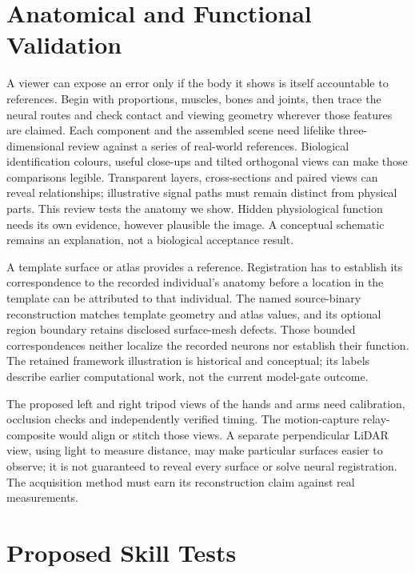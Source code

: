 \section{Anatomical and Functional Validation}

A viewer can expose an error only if the body it shows is itself accountable to references. Begin with proportions, muscles, bones and joints, then trace the neural routes and check contact and viewing geometry wherever those features are claimed. Each component and the assembled scene need lifelike three-dimensional review against a series of real-world references. Biological identification colours, useful close-ups and tilted orthogonal views can make those comparisons legible. Transparent layers, cross-sections and paired views can reveal relationships; illustrative signal paths must remain distinct from physical parts. This review tests the anatomy we show. Hidden physiological function needs its own evidence, however plausible the image. A conceptual schematic remains an explanation, not a biological acceptance result.\par

A template surface or atlas provides a reference. Registration has to establish its correspondence to the recorded individual's anatomy before a location in the template can be attributed to that individual. The named source-binary reconstruction matches template geometry and atlas values, and its optional region boundary retains disclosed surface-mesh defects. Those bounded correspondences neither localize the recorded neurons nor establish their function. The retained framework illustration is historical and conceptual; its labels describe earlier computational work, not the current model-gate outcome.\par

The proposed left and right tripod views of the hands and arms need calibration, occlusion checks and independently verified timing. The motion-capture relay-composite would align or stitch those views. A separate perpendicular LiDAR view, using light to measure distance, may make particular surfaces easier to observe; it is not guaranteed to reveal every surface or solve neural registration. The acquisition method must earn its reconstruction claim against real measurements.\par

\section{Proposed Skill Tests}

